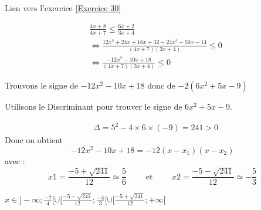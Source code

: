 \documentclass[12pt,fleqn]{report} %
\begin{document}
\begin{correction}Lien vers l'exercice   \ref{Exercice 30}
	
	\begin{align*}
	& \frac{4x+8}{4x+7}\leq\frac{6x+2}{3x+4}
	\\
	& \iff\frac{12x^2+24x+16x+32-24x^2-50x-14}{(4x+7)(3x+4)}\leq0
	\\
	& \iff \frac{-12x^2-10x+18}{(4x+7)(3x+4)}\leq 0
	\end{align*}
	
	Trouvons le signe de $-12x^2-10x+18$ donc de $-2(6x^2+5x-9)$
	
	Utilisons le Discriminant pour trouver le signe de $6x^2+5x-9$.
	
	\begin{align*}
	& \Delta=5^2-4\times 6\times(-9) = 241 >0 
	\end{align*}
	Donc on obtient 
	\[
	-12x^2-10x+18 = -12\left(x - x_1\right)\left(x - x_2\right)
	\]
	avec :
	\[
	x1=\frac{-5+\sqrt {241}}{12} \simeq \frac{5}{6} \qquad\text{ et }\qquad x2=\frac{-5-\sqrt{241}}{12} \simeq -\frac{5}{3}
	\]
	
	
	\begin{center}
	\end{center}
	
	
	
	
	$x\in ]-\infty ;\frac{-7}{4}[\cup[\frac{-5-\sqrt{241}}{12} ;\frac{-4}{3}[\cup[\frac{-5+\sqrt{241}}{12} ;+\infty[$
	
\end{correction}
\end{document}
